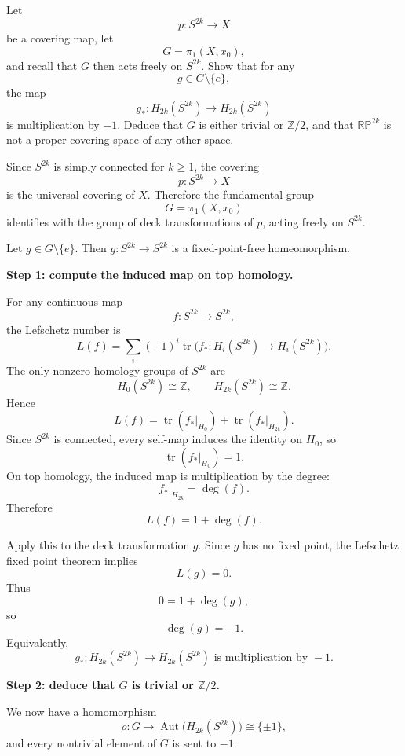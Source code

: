 \begin{problem}
Let
\[
p:S^{2k}\to X
\]
be a covering map, let
\[
G=\pi_1(X,x_0),
\]
and recall that \(G\) then acts freely on \(S^{2k}\). Show that for any
\[
g\in G\setminus\{e\},
\]
the map
\[
g_*:H_{2k}(S^{2k})\to H_{2k}(S^{2k})
\]
is multiplication by \(-1\). Deduce that \(G\) is either trivial or \(\mathbb Z/2\), and that \(\mathbb{RP}^{2k}\) is not a proper covering space of any other space.

\par
\end{problem}

\begin{solution}
Since \(S^{2k}\) is simply connected for \(k\ge 1\), the covering
\[
p:S^{2k}\to X
\]
is the universal covering of \(X\). Therefore the fundamental group
\[
G=\pi_1(X,x_0)
\]
identifies with the group of deck transformations of \(p\), acting freely on \(S^{2k}\).

Let \(g\in G\setminus\{e\}\). Then \(g:S^{2k}\to S^{2k}\) is a fixed-point-free homeomorphism.

\par

\textbf{Step 1: compute the induced map on top homology.}

For any continuous map
\[
f:S^{2k}\to S^{2k},
\]
the Lefschetz number is
\[
L(f)=\sum_i (-1)^i \operatorname{tr}\bigl(f_*:H_i(S^{2k})\to H_i(S^{2k})\bigr).
\]
The only nonzero homology groups of \(S^{2k}\) are
\[
H_0(S^{2k})\cong \mathbb Z,
\qquad
H_{2k}(S^{2k})\cong \mathbb Z.
\]
Hence
\[
L(f)=\operatorname{tr}(f_*|_{H_0})+\operatorname{tr}(f_*|_{H_{2k}}).
\]
Since \(S^{2k}\) is connected, every self-map induces the identity on \(H_0\), so
\[
\operatorname{tr}(f_*|_{H_0})=1.
\]
On top homology, the induced map is multiplication by the degree:
\[
f_*|_{H_{2k}}=\deg(f).
\]
Therefore
\[
L(f)=1+\deg(f).
\]

Apply this to the deck transformation \(g\). Since \(g\) has no fixed point, the Lefschetz fixed point theorem implies
\[
L(g)=0.
\]
Thus
\[
0=1+\deg(g),
\]
so
\[
\deg(g)=-1.
\]
Equivalently,
\[
\boxed{g_*:H_{2k}(S^{2k})\to H_{2k}(S^{2k}) \text{ is multiplication by } -1.}
\]

\par

\textbf{Step 2: deduce that \(G\) is trivial or \(\mathbb Z/2\).}

We now have a homomorphism
\[
\rho:G\to \operatorname{Aut}\bigl(H_{2k}(S^{2k})\bigr)\cong \{\pm 1\},
\]
and every nontrivial element of \(G\) is sent to \(-1\).


\end{solution}
